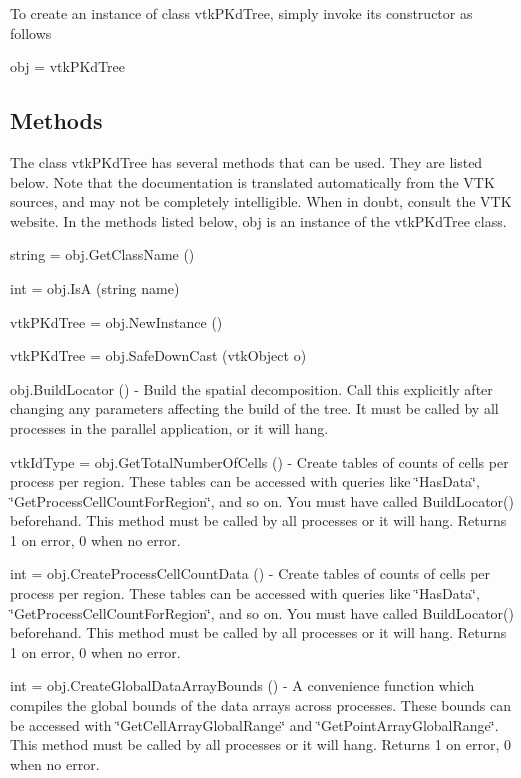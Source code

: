 To create an instance of class vtk\-P\-Kd\-Tree, simply invoke its constructor as follows \begin{DoxyVerb}  obj = vtkPKdTree
\end{DoxyVerb}
 \hypertarget{vtkwidgets_vtkxyplotwidget_Methods}{}\subsection{Methods}\label{vtkwidgets_vtkxyplotwidget_Methods}
The class vtk\-P\-Kd\-Tree has several methods that can be used. They are listed below. Note that the documentation is translated automatically from the V\-T\-K sources, and may not be completely intelligible. When in doubt, consult the V\-T\-K website. In the methods listed below, {\ttfamily obj} is an instance of the vtk\-P\-Kd\-Tree class. 
\begin{DoxyItemize}
\item {\ttfamily string = obj.\-Get\-Class\-Name ()}  
\item {\ttfamily int = obj.\-Is\-A (string name)}  
\item {\ttfamily vtk\-P\-Kd\-Tree = obj.\-New\-Instance ()}  
\item {\ttfamily vtk\-P\-Kd\-Tree = obj.\-Safe\-Down\-Cast (vtk\-Object o)}  
\item {\ttfamily obj.\-Build\-Locator ()} -\/ Build the spatial decomposition. Call this explicitly after changing any parameters affecting the build of the tree. It must be called by all processes in the parallel application, or it will hang.  
\item {\ttfamily vtk\-Id\-Type = obj.\-Get\-Total\-Number\-Of\-Cells ()} -\/ Create tables of counts of cells per process per region. These tables can be accessed with queries like \char`\"{}\-Has\-Data\char`\"{}, \char`\"{}\-Get\-Process\-Cell\-Count\-For\-Region\char`\"{}, and so on. You must have called Build\-Locator() beforehand. This method must be called by all processes or it will hang. Returns 1 on error, 0 when no error.  
\item {\ttfamily int = obj.\-Create\-Process\-Cell\-Count\-Data ()} -\/ Create tables of counts of cells per process per region. These tables can be accessed with queries like \char`\"{}\-Has\-Data\char`\"{}, \char`\"{}\-Get\-Process\-Cell\-Count\-For\-Region\char`\"{}, and so on. You must have called Build\-Locator() beforehand. This method must be called by all processes or it will hang. Returns 1 on error, 0 when no error.  
\item {\ttfamily int = obj.\-Create\-Global\-Data\-Array\-Bounds ()} -\/ A convenience function which compiles the global bounds of the data arrays across processes. These bounds can be accessed with \char`\"{}\-Get\-Cell\-Array\-Global\-Range\char`\"{} and \char`\"{}\-Get\-Point\-Array\-Global\-Range\char`\"{}. This method must be called by all processes or it will hang. Returns 1 on error, 0 when no error.  

\end{DoxyItemize}
